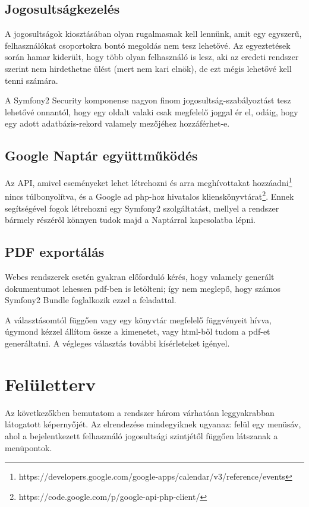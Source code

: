 \documentclass[a4paper,12pt,oneside]{report}
\begin{document}
\subsection{Jogosultságkezelés}

A jogosultságok kiosztásában olyan rugalmasnak kell lennünk, amit egy egyszerű, felhasználókat csoportokra bontó megoldás nem tesz lehetővé. Az egyeztetések során hamar kiderült, hogy több olyan felhasználó is lesz, aki az eredeti rendszer szerint nem hirdethetne ülést (mert nem kari elnök), de ezt mégis lehetővé kell tenni számára.

A Symfony2 Security komponense nagyon finom jogosultság-szabályoztást tesz lehetővé onnantól, hogy egy oldalt valaki csak megfelelő joggal ér el, odáig, hogy egy adott adatbázis-rekord valamely mezőjéhez hozzáférhet-e.

\subsection{Google Naptár együttműködés}

Az API, amivel eseményeket lehet létrehozni és arra meghívottakat hozzáadni\footnote{https://developers.google.com/google-apps/calendar/v3/reference/events} nincs túlbonyolítva, és a Google ad php-hoz hivatalos klienskönyvtárat\footnote{https://code.google.com/p/google-api-php-client/}. Ennek segítségével fogok létrehozni egy Symfony2 szolgáltatást, mellyel a rendszer bármely részéről könnyen tudok majd a Naptárral kapcsolatba lépni.

\subsection{PDF exportálás}

Webes rendszerek esetén gyakran előforduló kérés, hogy valamely generált dokumentumot lehessen pdf-ben is letölteni; így nem meglepő, hogy számos Symfony2 Bundle foglalkozik ezzel a feladattal.

A választásomtól függően vagy egy könyvtár megfelelő függvényeit hívva, úgymond kézzel állítom össze a kimenetet, vagy html-ből tudom a pdf-et generáltatni. A végleges választás további kísérleteket igényel.

\section{Felületterv}

Az következőkben bemutatom a rendszer három várhatóan leggyakrabban látogatott képernyőjét. Az elrendezése mindegyiknek ugyanaz: felül egy menüsáv, ahol a bejelentkezett felhasználó jogosultsági szintjétől függően látszanak a menüpontok.
\end{document}
